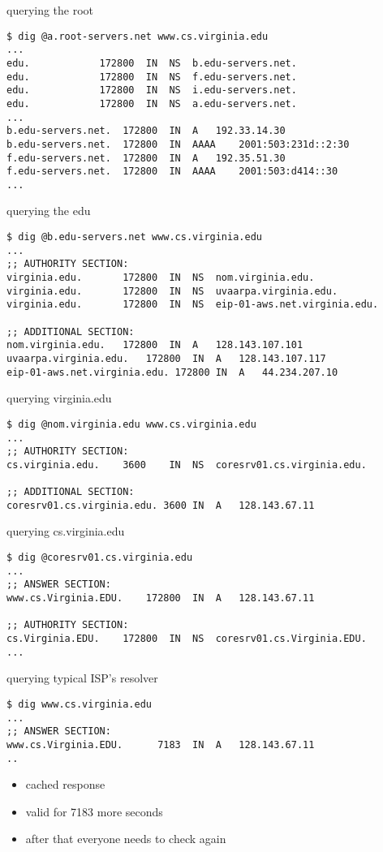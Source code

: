 
\begin{frame}[fragile]{querying the root}
\begin{Verbatim}[fontsize=\small]
$ dig @a.root-servers.net www.cs.virginia.edu
...
edu.			172800	IN	NS	b.edu-servers.net.
edu.			172800	IN	NS	f.edu-servers.net.
edu.			172800	IN	NS	i.edu-servers.net.
edu.			172800	IN	NS	a.edu-servers.net.
...
b.edu-servers.net.	172800	IN	A	192.33.14.30
b.edu-servers.net.	172800	IN	AAAA	2001:503:231d::2:30
f.edu-servers.net.	172800	IN	A	192.35.51.30
f.edu-servers.net.	172800	IN	AAAA	2001:503:d414::30
...
\end{Verbatim}
\end{frame}

\begin{frame}[fragile]{querying the edu}
\begin{Verbatim}[fontsize=\small]
$ dig @b.edu-servers.net www.cs.virginia.edu
...
;; AUTHORITY SECTION:
virginia.edu.		172800	IN	NS	nom.virginia.edu.
virginia.edu.		172800	IN	NS	uvaarpa.virginia.edu.
virginia.edu.		172800	IN	NS	eip-01-aws.net.virginia.edu.

;; ADDITIONAL SECTION:
nom.virginia.edu.	172800	IN	A	128.143.107.101
uvaarpa.virginia.edu.	172800	IN	A	128.143.107.117
eip-01-aws.net.virginia.edu. 172800 IN	A	44.234.207.10
\end{Verbatim}
\end{frame}
\begin{frame}[fragile]{querying virginia.edu}
\begin{Verbatim}[fontsize=\small]
$ dig @nom.virginia.edu www.cs.virginia.edu
...
;; AUTHORITY SECTION:
cs.virginia.edu.	3600	IN	NS	coresrv01.cs.virginia.edu.

;; ADDITIONAL SECTION:
coresrv01.cs.virginia.edu. 3600	IN	A	128.143.67.11
\end{Verbatim}
\end{frame}

\begin{frame}[fragile]{querying cs.virginia.edu}
\begin{Verbatim}[fontsize=\small]
$ dig @coresrv01.cs.virginia.edu
...
;; ANSWER SECTION:
www.cs.Virginia.EDU.	172800	IN	A	128.143.67.11

;; AUTHORITY SECTION:
cs.Virginia.EDU.	172800	IN	NS	coresrv01.cs.Virginia.EDU.
...
\end{Verbatim}
\end{frame}

\begin{frame}[fragile]{querying typical ISP's resolver}
\begin{Verbatim}[fontsize=\small]
$ dig www.cs.virginia.edu
...
;; ANSWER SECTION:
www.cs.Virginia.EDU.	  7183	IN	A	128.143.67.11
..
\end{Verbatim}
\begin{itemize}
\item cached response
\item valid for 7183  more seconds
\item after that everyone needs to check again
\end{itemize}
\end{frame}
